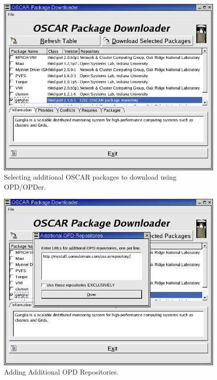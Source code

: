 \begin{figure}[ht!]
  \begin{center}
    \centerline{\includegraphics[scale=\imgscale]{figs/sbs-download-packages}}
    \caption[Downloading additional OSCAR packages.]{Selecting additional 
	OSCAR packages to download using OPD/OPDer.}
    \label{fig:sbs-download-packages}
  \end{center}
\end{figure}

\begin{figure}[ht!]
  \begin{center}
    \centerline{\includegraphics[scale=\imgscale]{figs/sbs-opder-alt-repository}}
    \caption[Adding additional OPD Repositories.]{Adding Additional OPD
        Repositories.}
    \label{fig:sbs-opder-alt-repository}
  \end{center}
\end{figure}


